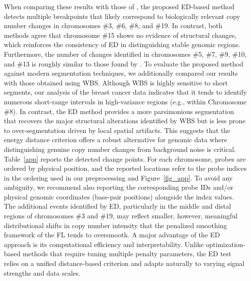 \documentclass[11pt]{article}
\numberwithin{theorem}{section}
\numberwithin{Lemma}{section}
\numberwithin{Definition}{section}
\begin{document}
When comparing these results with those of \cite{tib2008}, the proposed ED-based method detects multiple breakpoints that likely correspond to biologically relevant copy number changes in chromosomes \#3, \#6, \#8, and \#19. In contrast, both methods agree that chromosome \#15 shows no evidence of structural changes, which reinforces the consistency of ED in distinguishing stable genomic regions. Furthermore, the number of changes identified in chromosomes \#5, \#7, \#9, \#10, and \#13 is roughly similar to those found by \cite{tib2008}. To evaluate the proposed method against modern segmentation techniques, we additionally compared our results with those obtained using WBS. Although WBS is highly sensitive to short segments, our analysis of the breast cancer data indicates that it tends to identify numerous short-range intervals in high-variance regions (e.g., within Chromosome \#8). In contrast, the ED method provides a more parsimonious segmentation that recovers the major structural alterations identified by WBS but is less prone to over-segmentation driven by local spatial artifacts. This suggests that the energy distance criterion offers a robust alternative for genomic data where distinguishing genuine copy number changes from background noise is critical. Table~\ref{app} reports the detected change points. For each chromosome, probes are ordered by physical position, and the
reported locations refer to the probe indices in the ordering used in our preprocessing and Figure~\ref{fig_app}. To avoid any
ambiguity, we recommend also reporting the corresponding probe IDs and/or physical genomic coordinates
(base-pair positions) alongside the index values. The additional events identified by ED, particularly in the middle and distal regions of chromosomes \#3 and \#19, may reflect smaller, however, meaningful distributional shifts in copy number intensity that the penalized smoothing framework of the FL tends to oversmooth. A major advantage of the ED approach is its computational efficiency and interpretability. Unlike optimization-based methods that require tuning multiple penalty parameters, the ED test relies on a unified distance-based criterion and adapts naturally to varying signal strengths and data scales.
\end{document}
